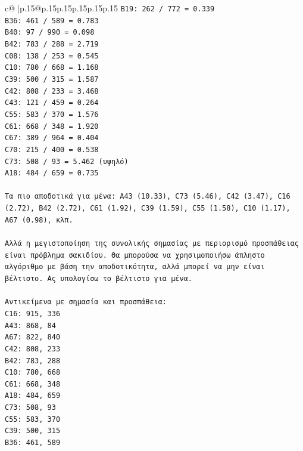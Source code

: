 \documentclass{article}
\begin{document}
{\begin{supertabular}{c@{$\;$}|p{.15\linewidth}@{}p{.15\linewidth}p{.15\linewidth}p{.15\linewidth}p{.15\linewidth}p{.15\linewidth}}
{{{\texttt{B19: 262 / 772 = 0.339} \\
\texttt{B36: 461 / 589 = 0.783} \\
\texttt{B40: 97 / 990 = 0.098} \\
\texttt{B42: 783 / 288 = 2.719} \\
\texttt{C08: 138 / 253 = 0.545} \\
\texttt{C10: 780 / 668 = 1.168} \\
\texttt{C39: 500 / 315 = 1.587} \\
\texttt{C42: 808 / 233 = 3.468} \\
\texttt{C43: 121 / 459 = 0.264} \\
\texttt{C55: 583 / 370 = 1.576} \\
\texttt{C61: 668 / 348 = 1.920} \\
\texttt{C67: 389 / 964 = 0.404} \\
\texttt{C70: 215 / 400 = 0.538} \\
\texttt{C73: 508 / 93 = 5.462 (υψηλό)} \\
\texttt{A18: 484 / 659 = 0.735} \\
\\ 
\texttt{Τα πιο αποδοτικά για μένα: A43 (10.33), C73 (5.46), C42 (3.47), C16 (2.72), B42 (2.72), C61 (1.92), C39 (1.59), C55 (1.58), C10 (1.17), A67 (0.98), κλπ.} \\
\\ 
\texttt{Αλλά η μεγιστοποίηση της συνολικής σημασίας με περιορισμό προσπάθειας είναι πρόβλημα σακιδίου. Θα μπορούσα να χρησιμοποιήσω άπληστο αλγόριθμο με βάση την αποδοτικότητα, αλλά μπορεί να μην είναι βέλτιστο. Ας υπολογίσω το βέλτιστο για μένα.} \\
\\ 
\texttt{Αντικείμενα με σημασία και προσπάθεια:} \\
\texttt{C16: 915, 336} \\
\texttt{A43: 868, 84} \\
\texttt{A67: 822, 840} \\
\texttt{C42: 808, 233} \\
\texttt{B42: 783, 288} \\
\texttt{C10: 780, 668} \\
\texttt{C61: 668, 348} \\
\texttt{A18: 484, 659} \\
\texttt{C73: 508, 93} \\
\texttt{C55: 583, 370} \\
\texttt{C39: 500, 315} \\
\texttt{B36: 461, 589} \\
}}}
\end{supertabular}}
\end{document}
